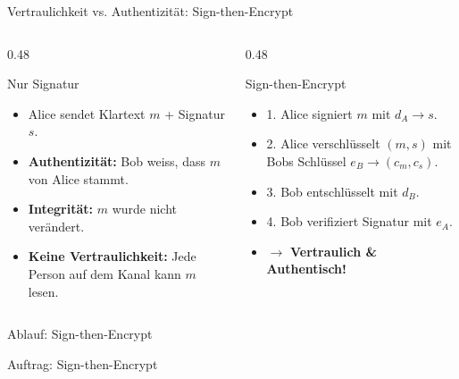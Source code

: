 \begin{frame}{Vertraulichkeit vs. Authentizität: Sign-then-Encrypt}
	\begin{columns}[T]
		\begin{column}{0.48\textwidth}
			\begin{block}{Nur Signatur}
				{\small
				\begin{itemize}
					\item Alice sendet Klartext $m$ + Signatur $s$.
					\item \textbf{Authentizität:} Bob weiss, dass $m$ von Alice stammt.
					\item \textbf{Integrität:} $m$ wurde nicht verändert.
					\item \textbf{Keine Vertraulichkeit:} Jede Person auf dem Kanal kann $m$ lesen.
				\end{itemize}
				}
			\end{block}
		\end{column}
		\begin{column}{0.48\textwidth}
			\begin{block}{Sign-then-Encrypt}
				{\small
				\begin{itemize}
					\item 1. Alice signiert $m$ mit $d_A \rightarrow s$.
					\item 2. Alice verschlüsselt $(m, s)$ mit Bobs Schlüssel $e_B \rightarrow (c_m, c_s)$.
					\item 3. Bob entschlüsselt mit $d_B$.
					\item 4. Bob verifiziert Signatur mit $e_A$.
					\item $\rightarrow$ \textbf{Vertraulich \& Authentisch!}
				\end{itemize}
				}
			\end{block}
		\end{column}
	\end{columns}
\end{frame}

\begin{frame}{Ablauf: Sign-then-Encrypt}
	\begin{figure}[H]
		\centering
		\resizebox{!}{0.75\textheight}{}
	\end{figure}
\end{frame}

\begin{frame}{Auftrag: Sign-then-Encrypt}
\end{frame}
